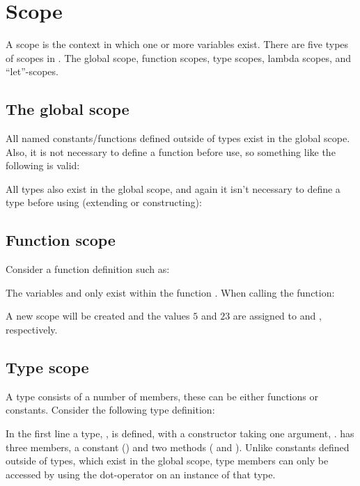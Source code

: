 \section{Scope}
\label{sec:scoping}

A scope is the context in which one or more variables exist.
There are five types of scopes in \productname{}. The global scope,
function scopes, type scopes, lambda scopes, and ``let''-scopes.

\subsection{The global scope}

All named constants/functions defined outside of types exist in the global scope.
Also, it is not necessary to define a function before use, so something
like the following is valid:


All types also exist in the global scope, and again it isn't necessary to define
a type before using (extending or constructing):


\subsection{Function scope}
Consider a function definition such as:


The variables  and  only exist within the function .
When calling the function:


A new scope will be created and the values $5$ and $23$
are assigned to  and , respectively.


\subsection{Type scope}

A type consists of a number of members, these can be either functions or constants.
Consider the following type definition:


In the first line a type, , is defined, with a constructor taking one
argument, .  has three members, a constant ()
and two methods ( and ). Unlike constants defined
outside of types, which exist in the global scope, type members can only be accessed by
using the dot-operator on an instance of that type.

